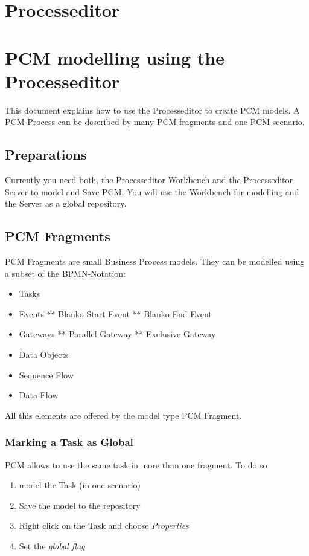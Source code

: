 \documentclass{acm_proc_article-sp}
\begin{document}
%
%
\section{Processeditor}

%
%
\section{PCM modelling using the Processeditor}\label{pcm-modelling-using-the-processeditor}
This document explains how to use the Processeditor to create PCM
models. A PCM-Process can be described by many PCM fragments and one PCM
scenario.

%
%
\subsection{Preparations}\label{preparations}
Currently you need both, the Processeditor Workbench and the
Processeditor Server to model and Save PCM. You will use the Workbench
for modelling and the Server as a global repository.

%
%
\subsection{PCM Fragments}\label{pcm-fragments}

PCM Fragments are small Business Process models. They can be modelled
using a subset of the BPMN-Notation:

\begin{itemize}
\itemsep1pt\parskip0pt
\item
  Tasks
\item
  Events ** Blanko Start-Event ** Blanko End-Event
\item
  Gateways ** Parallel Gateway ** Exclusive Gateway
\item
  Data Objects
\item
  Sequence Flow
\item
  Data Flow
\end{itemize}

All this elements are offered by the model type PCM Fragment.

%
%
\subsubsection{Marking a Task as Global}\label{marking-a-task-as-global}
PCM allows to use the same task in more than one fragment. To do so

\begin{enumerate}
\def\labelenumi{\arabic{enumi}.}
\itemsep1pt\parskip0pt
\item
  model the Task (in one scenario)
\item
  Save the model to the repository
\item
  Right click on the Task and choose \emph{Properties}
\item
  Set the \emph{global flag}
\end{enumerate}
\end{document}
